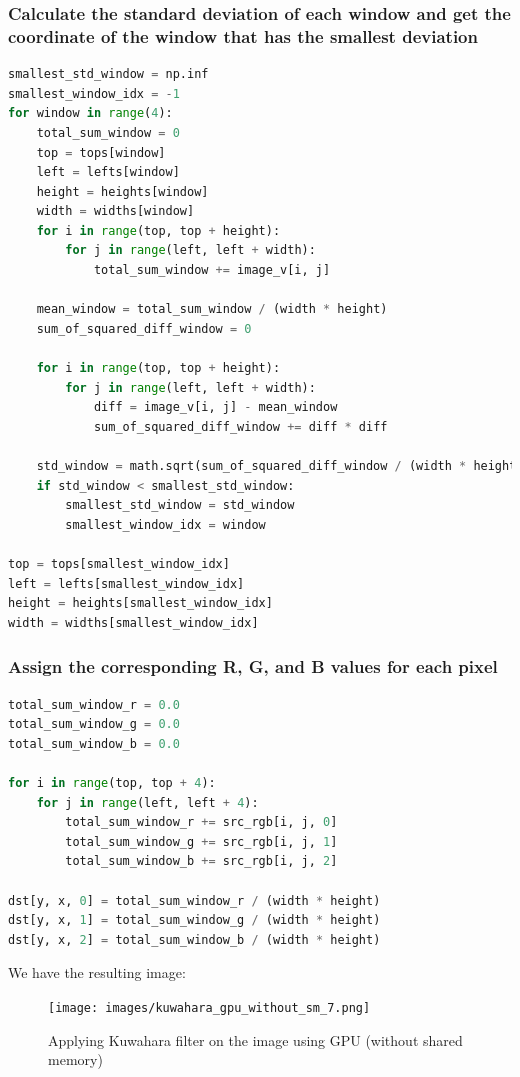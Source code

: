 \documentclass[12pt]{article}
\begin{document}
\subsubsection{Calculate the standard deviation of each window and get the coordinate of the window that has the smallest deviation}
\begin{lstlisting}[language=Python]
smallest_std_window = np.inf
smallest_window_idx = -1
for window in range(4):
    total_sum_window = 0
    top = tops[window]
    left = lefts[window]
    height = heights[window]
    width = widths[window]
    for i in range(top, top + height):
        for j in range(left, left + width):
            total_sum_window += image_v[i, j]

    mean_window = total_sum_window / (width * height)
    sum_of_squared_diff_window = 0

    for i in range(top, top + height):
        for j in range(left, left + width):
            diff = image_v[i, j] - mean_window
            sum_of_squared_diff_window += diff * diff

    std_window = math.sqrt(sum_of_squared_diff_window / (width * height))
    if std_window < smallest_std_window:
        smallest_std_window = std_window
        smallest_window_idx = window

top = tops[smallest_window_idx]
left = lefts[smallest_window_idx]
height = heights[smallest_window_idx]
width = widths[smallest_window_idx]
\end{lstlisting}

\subsubsection{Assign the corresponding R, G, and B values for each pixel}
\begin{lstlisting}[language=Python]
total_sum_window_r = 0.0
total_sum_window_g = 0.0
total_sum_window_b = 0.0

for i in range(top, top + 4):
    for j in range(left, left + 4):
        total_sum_window_r += src_rgb[i, j, 0]
        total_sum_window_g += src_rgb[i, j, 1]
        total_sum_window_b += src_rgb[i, j, 2]

dst[y, x, 0] = total_sum_window_r / (width * height)
dst[y, x, 1] = total_sum_window_g / (width * height)
dst[y, x, 2] = total_sum_window_b / (width * height)
\end{lstlisting}

\noindent
We have the resulting image:
\begin{figure}[H]
\centering
    \texttt{[image: images/kuwahara\_gpu\_without\_sm\_7.png]}
    \caption{Applying Kuwahara filter on the image using GPU (without shared memory)}
\end{figure}
\end{document}
